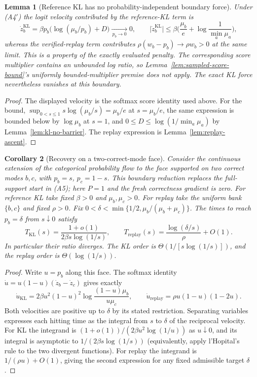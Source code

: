 \documentclass{article}
\newcommand{\enforcehalffinalproseline}{%
  \setlength{\parfillskip}{0pt plus .20\linewidth}}
\newcommand{\1}{\mathbf 1}
\newtheorem{lemma}{Lemma}[section]
\newtheorem{corollary}[lemma]{Corollary}
\theoremstyle{remark}
\theoremstyle{definition}
\theoremstyle{plain}
\begin{document}
\begin{lemma}[Reference KL has no probability-independent boundary force]
\enforcehalffinalproseline
\label{lem:kl-boundary-force}
Under (A4$'$) the logit velocity contributed by the reference-KL term is
\[
  \dot z^{\mathrm{KL}}_b=\beta p_b\big(\log(\mu_b/p_b)+D\big)
  \xrightarrow[\,p_b\to0\,]{}0,
  \qquad
  \big|\dot z^{\mathrm{KL}}_b\big|
  \le\beta\Big(\frac{\mu_b}{e}+\log\frac1{\min_a\mu_a}\Big),
\]
whereas the verified-replay term contributes $\rho(w_b-p_b)\to\rho w_b>0$ at
the same limit. This is a property of the exactly evaluated penalty. The corresponding score multiplier contains
an unbounded log ratio, so Lemma~\ref{lem:sampled-score-bound}'s uniformly
bounded-multiplier premise does not apply. The exact KL force nevertheless
vanishes at this boundary.
\end{lemma}

\begin{proof}
\enforcehalffinalproseline
The displayed velocity is the softmax score identity used above. For the
bound, $\sup_{0<s\le1}s\log(\mu_b/s)=\mu_b/e$ at $s=\mu_b/e$, the same
expression is bounded below by $\log\mu_b$ at $s=1$, and $0\le D\le
\log(1/\min_a\mu_a)$ by Lemma~\ref{lem:kl-no-barrier}. The replay expression is
Lemma~\ref{lem:replay-ascent}.
\end{proof}

\begin{corollary}[Recovery on a two-correct-mode face]
\enforcehalffinalproseline
\label{cor:kl-recovery-time}
Consider the continuous extension of the categorical probability flow to
the face supported on two correct modes $b,c$, with $p_b=s$, $p_c=1-s$.
This boundary reduction replaces the full-support start in (A5); here $P=1$
and the fresh correctness gradient is zero. For reference KL take fixed
$\beta>0$ and $\mu_b,\mu_c>0$. For replay take the uniform bank $\{b,c\}$
and fixed $\rho>0$. Fix
$0<\delta<\min\{1/2,\mu_b/(\mu_b+\mu_c)\}$.
The times to reach $p_b=\delta$ from $s\downarrow0$ satisfy
\[
 T_{\mathrm{KL}}(s)
 =\frac{1+o(1)}{2\beta s\log(1/s)},\qquad
 T_{\mathrm{replay}}(s)
 =\frac{\log(\delta/s)}{\rho}+O(1).
\]
In particular their ratio diverges. The KL order is
$\Theta(1/[s\log(1/s)])$, and the replay order is
$\Theta(\log(1/s))$.
\end{corollary}
\begin{proof}
\enforcehalffinalproseline
Write $u=p_b$ along this face. The softmax identity
$\dot u=u(1-u)(\dot z_b-\dot z_c)$ gives exactly
\[
 \dot u_{\mathrm{KL}}
 =2\beta u^2(1-u)^2\log\frac{(1-u)\mu_b}{u\mu_c},
 \qquad
 \dot u_{\mathrm{replay}}
 =\rho u(1-u)(1-2u).
\]
Both velocities are positive up to $\delta$ by its stated restriction.
Separating variables expresses each hitting time as the integral from
$s$ to $\delta$ of the reciprocal velocity. For KL the integrand is
$(1+o(1))/(2\beta u^2\log(1/u))$ as $u\downarrow0$, and its integral is
asymptotic to $1/(2\beta s\log(1/s))$ (equivalently, apply
l'Hopital's rule to the two divergent functions). For replay the integrand
is $1/(\rho u)+O(1)$, giving the second expression for any fixed admissible target $\delta$.
\end{proof}
\end{document}

